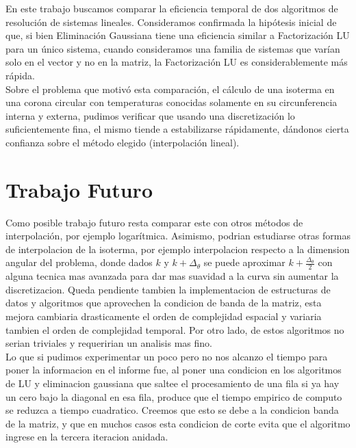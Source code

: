 
En este trabajo buscamos comparar la eficiencia temporal de dos algoritmos de resolución de sistemas lineales. Consideramos confirmada la hipótesis inicial de que, si bien Eliminación Gaussiana tiene una eficiencia similar a Factorización LU para un único sistema, cuando consideramos una familia de sistemas que varían solo en el vector y no en la matriz, la Factorización LU es considerablemente más rápida. \\

Sobre el problema que motivó esta comparación, el cálculo de una isoterma en una corona circular con temperaturas conocidas solamente en su circunferencia interna y externa, pudimos verificar que usando una discretización lo suficientemente fina, el mismo tiende a estabilizarse rápidamente, dándonos cierta confianza sobre el método elegido (interpolación lineal).\\

\section{Trabajo Futuro}
 Como posible trabajo futuro resta comparar este con otros métodos de interpolación, por ejemplo logarítmica. Asimismo, podrian estudiarse otras formas de interpolacion de la isoterma, por ejemplo interpolacion respecto a la dimension angular del problema, donde dados $k$ y $k + \Delta_\theta$ se puede aproximar $k + \frac{\Delta_\theta}{2}$ con alguna tecnica mas avanzada para dar mas suavidad a la curva sin aumentar la discretizacion. Queda pendiente tambien la implementacion de estructuras de datos y algoritmos que aprovechen la condicion de banda de la matriz, esta mejora cambiaria drasticamente el orden de complejidad espacial y variaria tambien el orden de complejidad temporal. Por otro lado, de estos algoritmos no serian triviales y requeririan un analisis mas fino.\\
 
 Lo que si pudimos experimentar un poco pero no nos alcanzo el tiempo para poner la informacion en el informe fue, al poner una condicion en los algoritmos de LU y eliminacion gaussiana que saltee el procesamiento de una fila si ya hay un cero bajo la diagonal en esa fila, produce que el tiempo empirico de computo se reduzca a tiempo cuadratico. Creemos que esto se debe a la condicion banda de la matriz, y que en muchos casos esta condicion de corte evita que el algoritmo ingrese en la tercera iteracion anidada.